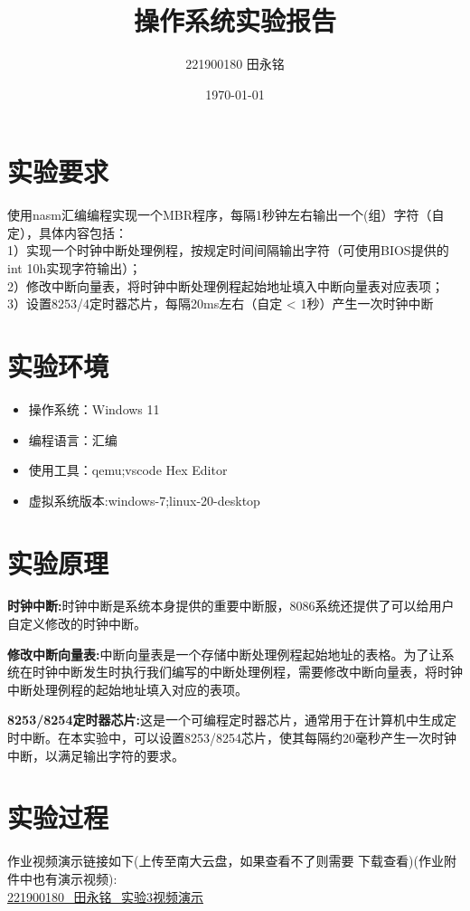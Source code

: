 \documentclass{LabReport}
\title{操作系统实验报告}
\author{221900180 田永铭}
\date{\today}
\begin{document}
	\maketitle
	\section{实验要求}
	使用nasm汇编编程实现一个MBR程序，每隔1秒钟左右输出一个(组）字符（自定），具体内容包括：\\
	1）实现一个时钟中断处理例程，按规定时间间隔输出字符（可使用BIOS提供的int 10h实现字符输出）；\\
	2）修改中断向量表，将时钟中断处理例程起始地址填入中断向量表对应表项；\\
	3）设置8253/4定时器芯片，每隔20ms左右（自定 < 1秒）产生一次时钟中断
	\section{实验环境}
	
	\begin{itemize}
		\item 操作系统：Windows 11
		\item 编程语言：汇编
		\item 使用工具：qemu;vscode Hex Editor
		\item 虚拟系统版本:windows-7;linux-20-desktop
	\end{itemize}
	\section{实验原理}
	\textbf{时钟中断:}时钟中断是系统本身提供的重要中断服，8086系统还提供了可以给用户自定义修改的时钟中断。\par
	\hspace{0.1em}\textbf{修改中断向量表:}中断向量表是一个存储中断处理例程起始地址的表格。为了让系统在时钟中断发生时执行我们编写的中断处理例程，需要修改中断向量表，将时钟中断处理例程的起始地址填入对应的表项。\par
	\hspace{0.1em}\textbf{8253/8254定时器芯片:}这是一个可编程定时器芯片，通常用于在计算机中生成定时中断。在本实验中，可以设置8253/8254芯片，使其每隔约20毫秒产生一次时钟中断，以满足输出字符的要求。
	
	\section{实验过程}
	作业视频演示链接如下(上传至南大云盘，如果查看不了则需要{\color{red} 下载}查看)(作业附件中也有演示视频):\\
	\href{https://box.nju.edu.cn/f/d617483fc46f4cd98a7d/}{\color{red} 221900180\_田永铭\_实验3视频演示}\\
	
\end{document}
